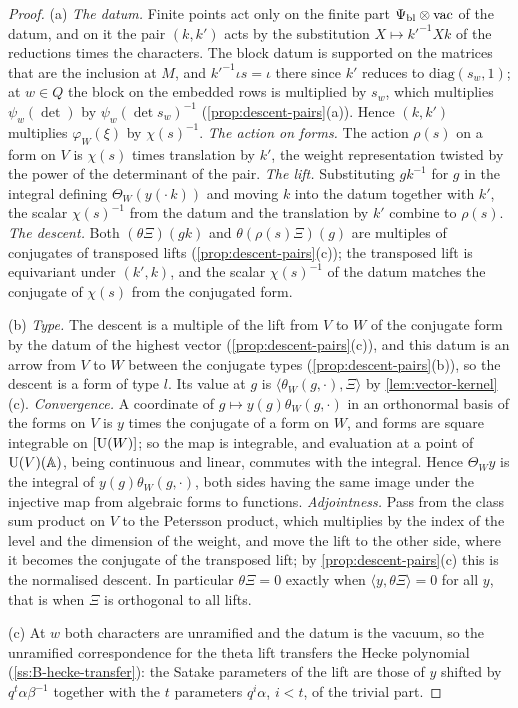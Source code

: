 \begin{proof}
(a) \emph{The datum.} Finite points act only on the finite part $\Psi_{\rm bl}\otimes\mathrm{vac}$ of the datum, and on it the pair $(k,k')$ acts by the substitution $X\mapsto k'^{-1}Xk$ of the reductions times the characters. The block datum is supported on
the matrices that are the inclusion at $M$, and $k'^{-1}\iota s=\iota$ there since $k'$ reduces to $\mathrm{diag}(s_w,1)$; at $w\in Q$ the block on the embedded rows is multiplied by $s_w$, which multiplies $\psi_w(\det)$ by $\psi_w(\det s_w)^{-1}$
(\cref{prop:descent-pairs}(a)). Hence $(k,k')$ multiplies $\varphi_W(\xi)$ by $\chi(s)^{-1}$. \emph{The action on forms.} The action $\rho(s)$ on a form on $V$ is $\chi(s)$ times translation by $k'$, the weight representation twisted by the
power of the determinant of the pair. \emph{The lift.} Substituting $gk^{-1}$ for $g$ in the integral defining $\Theta_W(y(\cdot\,k))$ and moving $k$ into the datum together with $k'$, the scalar $\chi(s)^{-1}$ from the datum and the translation by $k'$
combine to $\rho(s)$. \emph{The descent.} Both $(\theta\Xi)(gk)$ and $\theta(\rho(s)\Xi)(g)$ are multiples of conjugates of transposed lifts (\cref{prop:descent-pairs}(c)); the transposed lift is equivariant under $(k',k)$, and the scalar $\chi(s)^{-1}$ of the datum
matches the conjugate of $\chi(s)$ from the conjugated form.

(b) \emph{Type.} The descent is a multiple of the lift from $V$ to $W$ of the conjugate form by the datum of the highest vector (\cref{prop:descent-pairs}(c)), and this datum is an arrow from $V$ to $W$ between the conjugate types
(\cref{prop:descent-pairs}(b)), so the descent is a form of type $l$. Its value at $g$ is $\langle\theta_W(g,\cdot),\Xi\rangle$ by \cref{lem:vector-kernel}(c). \emph{Convergence.} A coordinate of $g\mapsto y(g)\theta_W(g,\cdot)$ in an orthonormal basis of the forms on $V$ is
$y$ times the conjugate of a form on $W$, and forms are square integrable on $[\operatorname{U}(W)]$; so the map is integrable, and evaluation at a point of $\operatorname{U}(V)(\mathbb{A})$, being continuous and linear, commutes with the integral. Hence $\Theta_Wy$ is the
integral of $y(g)\theta_W(g,\cdot)$, both sides having the same image under the injective map from algebraic forms to functions. \emph{Adjointness.} Pass from the class sum product on $V$ to the Petersson product, which multiplies by the
index of the level and the dimension of the weight, and move the lift to the other side, where it becomes the conjugate of the transposed lift; by \cref{prop:descent-pairs}(c) this is the normalised descent. In particular $\theta\Xi=0$
exactly when $\langle y,\theta\Xi\rangle=0$ for all $y$, that is when $\Xi$ is orthogonal to all lifts.

(c) At $w$ both characters are unramified and the datum is the vacuum, so the unramified correspondence for the theta lift transfers the Hecke polynomial (\cref{ss:B-hecke-transfer}): the Satake parameters of the lift are those of $y$ shifted by
$q^t\alpha\beta^{-1}$ together with the $t$ parameters $q^i\alpha$, $i<t$, of the trivial part.
\end{proof}

